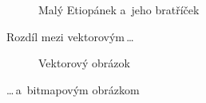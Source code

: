 \documentclass[a4paper,11pt]{article}
\begin{document}
\begin{figure}[h]
{
}
\caption{Malý Etiopánek a~jeho bratříček}
\label{pic:Etiopan}
\end{figure}

Rozdíl mezi vektorovým\,\dots

\begin{figure}[h]
\centering
\caption{Vektorový obrázok}
\label{pic:Vector}
\end{figure}
\bigskip
\noindent\dots\,a~bitmapovým obrázkom
\end{document}
